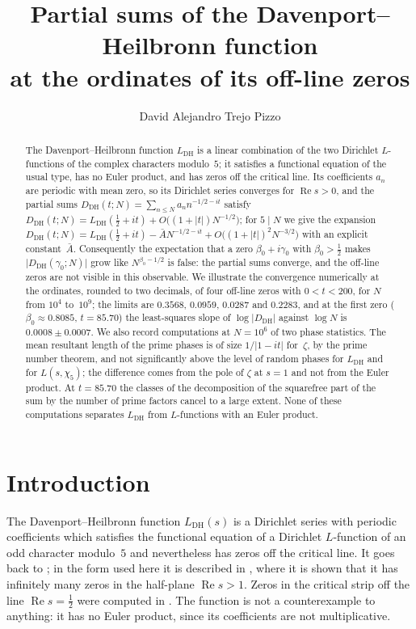 \documentclass[11pt]{amsart}
\title[Partial sums of the Davenport--Heilbronn function]{Partial sums of
the Davenport--Heilbronn function\\ at the ordinates of its off-line zeros}
\author{David Alejandro Trejo Pizzo}
\theoremstyle{definition}
\theoremstyle{remark}
\renewcommand{\DH}{\mathrm{DH}}
\newcommand{\abs}[1]{\lvert #1 \rvert}
\newcommand{\re}{\operatorname{Re}}
\newcommand{\Abar}{\bar A}
\begin{document}
\begin{abstract}
The Davenport--Heilbronn function $L_{\DH}$ is a linear combination of the
two Dirichlet $L$-functions of the complex characters modulo~$5$; it
satisfies a functional equation of the usual type, has no Euler product, and
has zeros off the critical line.  Its coefficients $a_n$ are periodic with
mean zero, so its Dirichlet series converges for $\re s>0$, and the partial
sums $D_{\DH}(t;N)=\sum_{n\le N}a_n n^{-1/2-it}$ satisfy
$D_{\DH}(t;N)=L_{\DH}(\tfrac12+it)+O\bigl((1+\abs t)N^{-1/2}\bigr)$; for
$5\mid N$ we give the expansion
$D_{\DH}(t;N)=L_{\DH}(\tfrac12+it)-\Abar N^{-1/2-it}
+O\bigl((1+\abs t)^2N^{-3/2}\bigr)$ with an explicit constant~$\Abar$.
Consequently the expectation that a zero $\beta_0+i\gamma_0$ with
$\beta_0>\tfrac12$ makes $\abs{D_{\DH}(\gamma_0;N)}$ grow like
$N^{\beta_0-1/2}$ is false: the partial sums converge, and the off-line
zeros are not visible in this observable.  We illustrate the convergence
numerically at the ordinates, rounded to two decimals, of four off-line
zeros with $0<t<200$, for $N$ from $10^4$ to~$10^9$; the limits are
$0.3568$, $0.0959$, $0.0287$ and $0.2283$, and at the first zero
($\beta_0\approx0.8085$, $t=85.70$) the least-squares slope of
$\log\abs{D_{\DH}}$ against $\log N$ is $0.0008\pm0.0007$.  We also record
computations at $N=10^6$ of two phase statistics.  The mean resultant
length of the prime phases is of size $1/\abs{1-it}$ for~$\zeta$, by the
prime number theorem, and not significantly above the level of random phases for
$L_{\DH}$ and for $L(s,\chi_5)$; the difference comes from the pole of $\zeta$ at $s=1$
and not from the Euler product.  At $t=85.70$ the classes of the
decomposition of the squarefree part of the sum by the number of prime
factors cancel to a large extent.  None of these computations separates
$L_{\DH}$ from $L$-functions with an Euler product.
\end{abstract}

\maketitle

\section{Introduction}\label{sec:intro}

The Davenport--Heilbronn function $L_{\DH}(s)$ is a Dirichlet series with
periodic coefficients which satisfies the functional equation of a
Dirichlet $L$-function of an odd character modulo~$5$ and nevertheless has
zeros off the critical line.  It goes back to
\cite{DavenportHeilbronn1936}; in the form used here it is described in
\cite[\S10.25]{Titchmarsh1986}, where it is shown that it has infinitely
many zeros in the half-plane $\re s>1$.  Zeros in the critical strip off
the line $\re s=\tfrac12$ were computed in
\cite{Spira1994,BalanzarioSanchezOrtiz2007}.  The function is not a
counterexample to anything: it has no Euler product, since its coefficients
are not multiplicative.
\end{document}
